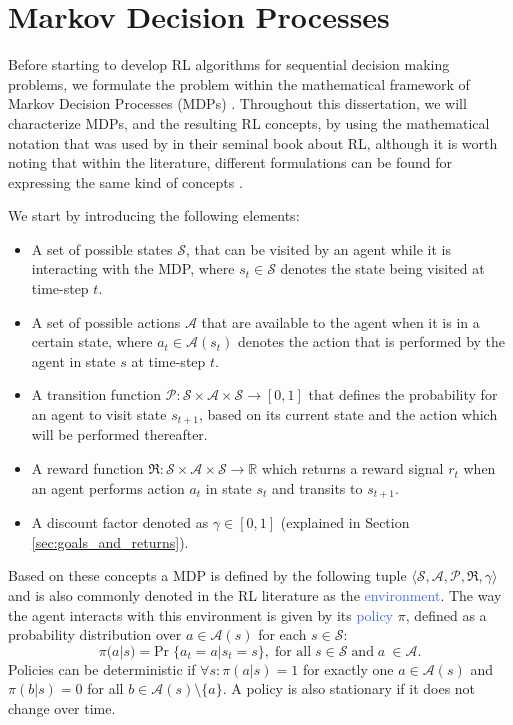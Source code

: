 \section{Markov Decision Processes}
\label{sec:mdps}

Before starting to develop RL algorithms for sequential decision making problems, we formulate the problem within the mathematical framework of Markov Decision Processes (MDPs) \cite{puterman1990markov,puterman2014markov}. Throughout this dissertation, we will characterize MDPs, and the resulting RL concepts, by using the mathematical notation that was used by \citet{sutton2018reinforcement} in their seminal book about RL, although it is worth noting that within the literature, different formulations can be found for expressing the same kind of concepts \cite{bertsekas1995neuro,busoniu2010reinforcement,bertsekas2000dynamic,bertsekas2019reinforcement}.

We start by introducing the following elements:
\begin{itemize}
	\item A set of possible states $\mathcal{S}$, that can be visited by an agent while it is interacting with the MDP, where $s_t \in \mathcal{S}$ denotes the state being visited at time-step $t$.
	\item A set of possible actions $\mathcal{A}$ that are available to the agent when it is in a certain state, where $a_t \in \mathcal{A}(s_t)$ denotes the action that is performed by the agent in state $s$ at time-step $t$.
\item A transition function $\mathcal{P}:\mathcal{S}\times\mathcal{A}\times\mathcal{S}\rightarrow [0,1]$ that defines the probability for an agent to visit state $s_{t+1}$, based on its current state and the action which will be performed thereafter.
\item A reward function $\Re:\mathcal{S}\times\mathcal{A}\times\mathcal{S}\rightarrow \mathbb{R}$ which returns a reward signal $r_{t}$ when an agent performs action $a_t$ in state $s_t$ and transits to $s_{t+1}$.
\item A discount factor denoted as $\gamma \in [0,1]$ (explained in Section \ref{sec:goals_and_returns}).

\end{itemize}

Based on these concepts a MDP is defined by the following tuple $\langle\mathcal{S}, \mathcal{A}, \mathcal{P}, \Re, \gamma\rangle$ and is also commonly denoted in the RL literature as the \textcolor{RoyalBlue}{environment}. The way the agent interacts with this environment is given by its \textcolor{RoyalBlue}{policy} $\pi$, defined as a probability distribution over $a \in \mathcal{A}(s)$ for each $s \in \mathcal{S}$:
\begin{equation}
	\pi(a|s) = \text{Pr}\; \{a_t = a | s_t = s\}, \; \text{for all}\; s \in \mathcal{S}\; \text{and}\; a\ \in \mathcal{A}. 
\end{equation}
Policies can be deterministic if $\forall s: \pi(a|s) = 1$ for exactly one $a\in \mathcal{A}(s)$ and $\pi(b|s) = 0$ for all $b\in \mathcal{A}(s)\setminus\{a\}$. A policy is also stationary if it does not change over time.

